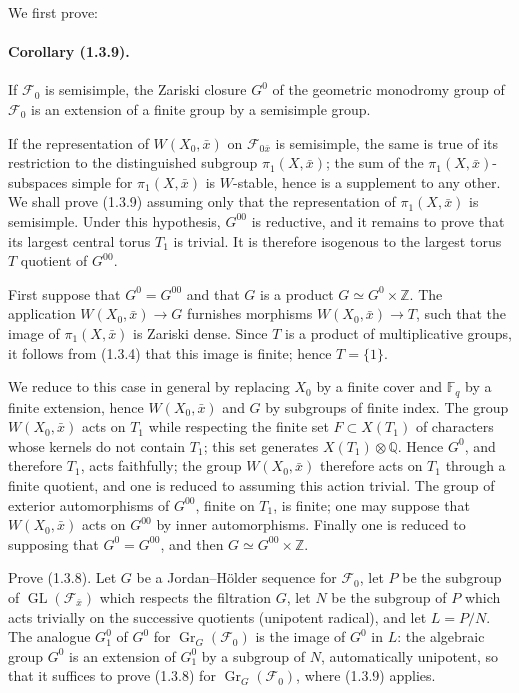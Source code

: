 \documentclass[11pt]{article}
\theoremstyle{remark}
\newcommand{\ZZ}{\mathbb{Z}}
\newcommand{\Fq}{\mathbb{F}_q}
\newcommand{\GL}{\operatorname{GL}}
\begin{document}
We first prove:

\paragraph{Corollary (1.3.9).} If $\mathcal F_0$ is semisimple, the Zariski closure $G^0$ of the geometric monodromy group of $\mathcal F_0$ is an extension of a finite group by a semisimple group.

If the representation of $W(X_0,\bar x)$ on $\mathcal F_{0\bar x}$ is semisimple, the same is true of its restriction to the distinguished subgroup $\pi_1(X,\bar x)$; the sum of the $\pi_1(X,\bar x)$-subspaces simple for $\pi_1(X,\bar x)$ is $W$-stable, hence is a supplement to any other. We shall prove (1.3.9) assuming only that the representation of $\pi_1(X,\bar x)$ is semisimple. Under this hypothesis, $G^{00}$ is reductive, and it remains to prove that its largest central torus $T_1$ is trivial. It is therefore isogenous to the largest torus $T$ quotient of $G^{00}$.

First suppose that $G^0=G^{00}$ and that $G$ is a product $G\simeq G^0\times\ZZ$. The application $W(X_0,\bar x)\to G$ furnishes morphisms $W(X_0,\bar x)\to T$, such that the image of $\pi_1(X,\bar x)$ is Zariski dense. Since $T$ is a product of multiplicative groups, it follows from (1.3.4) that this image is finite; hence $T=\{1\}$.

We reduce to this case in general by replacing $X_0$ by a finite cover and $\Fq$ by a finite extension, hence $W(X_0,\bar x)$ and $G$ by subgroups of finite index. The group $W(X_0,\bar x)$ acts on $T_1$ while respecting the finite set $F\subset X(T_1)$ of characters whose kernels do not contain $T_1$; this set generates $X(T_1)\otimes\mathbb Q$. Hence $G^0$, and therefore $T_1$, acts faithfully; the group $W(X_0,\bar x)$ therefore acts on $T_1$ through a finite quotient, and one is reduced to assuming this action trivial. The group of exterior automorphisms of $G^{00}$, finite on $T_1$, is finite; one may suppose that $W(X_0,\bar x)$ acts on $G^{00}$ by inner automorphisms. Finally one is reduced to supposing that $G^0=G^{00}$, and then $G\simeq G^{00}\times\ZZ$.

Prove (1.3.8). Let $G$ be a Jordan--Hölder sequence for $\mathcal F_0$, let $P$ be the subgroup of $\GL(\mathcal F_{\bar x})$ which respects the filtration $G$, let $N$ be the subgroup of $P$ which acts trivially on the successive quotients (unipotent radical), and let $L=P/N$. The analogue $G_1^0$ of $G^0$ for $\operatorname{Gr}_G(\mathcal F_0)$ is the image of $G^0$ in $L$: the algebraic group $G^0$ is an extension of $G_1^0$ by a subgroup of $N$, automatically unipotent, so that it suffices to prove (1.3.8) for $\operatorname{Gr}_G(\mathcal F_0)$, where (1.3.9) applies.
\end{document}
